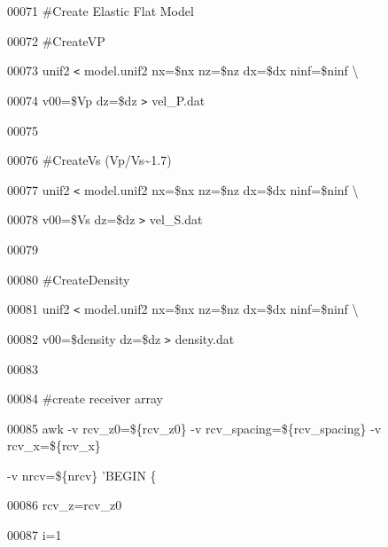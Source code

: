\documentclass{article}
\begin{document}
\vspace{4pt}
00071 \#Create Elastic Flat Model\label{l00072}

\vspace{4pt}
00072 \#CreateVP\label{l00073}

\vspace{4pt}
00073 unif2 \texttt{<}  model.unif2  nx=\$nx nz=\$nz dx=\$dx ninf=\$ninf \textbackslash{}\label{l00074}

\vspace{4pt}
00074 v00=\$Vp dz=\$dz \texttt{>} vel\_P.dat\label{l00075}

\vspace{4pt}
00075 \label{l00076}

\vspace{4pt}
00076 \#CreateVs (Vp/Vs\textasciitilde{}1.7)\label{l00077}

\vspace{4pt}
00077 unif2 \texttt{<}  model.unif2  nx=\$nx nz=\$nz dx=\$dx ninf=\$ninf \textbackslash{}\label{l00078}

\vspace{4pt}
00078 v00=\$Vs dz=\$dz \texttt{>} vel\_S.dat\label{l00079}

\vspace{4pt}
00079 \label{l00080}

\vspace{4pt}
00080 \#CreateDensity\label{l00081}

\vspace{4pt}
00081 unif2 \texttt{<}  model.unif2  nx=\$nx nz=\$nz dx=\$dx ninf=\$ninf \textbackslash{}\label{l00082}

\vspace{4pt}
00082 v00=\$density dz=\$dz \texttt{>} density.dat\label{l00083}

\vspace{4pt}
00083 \label{l00084}

\vspace{4pt}
00084 \#create receiver array\label{l00085}

\vspace{4pt}
00085 awk -v rcv\_z0=\$\{rcv\_z0\} -v rcv\_spacing=\$\{rcv\_spacing\} -v rcv\_x=\$\{rcv\_x\} 

\vspace{4pt}
-v nrcv=\$\{nrcv\} 'BEGIN \{\label{l00086}

\vspace{4pt}
00086            rcv\_z=rcv\_z0\label{l00087}

\vspace{4pt}
00087            i=1\label{l00088}
\end{document}
